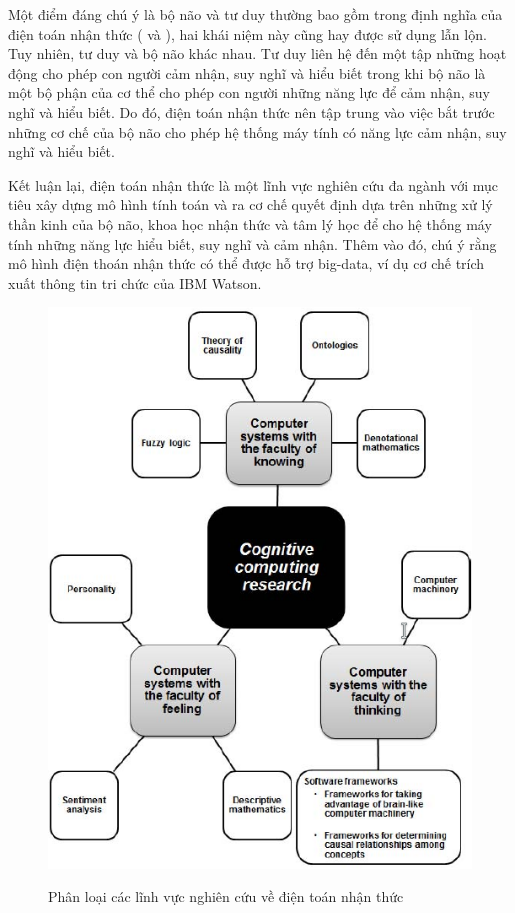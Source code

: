 \documentclass{article}
\begin{document}
Một điểm đáng chú ý là bộ não và tư duy thường bao gồm trong định nghĩa của điện toán nhận thức (\citet{wang2012denotational} và \citet{modha2011cognitive}), hai khái niệm này cũng hay được sử dụng lẫn lộn. Tuy nhiên, tư duy và bộ não khác nhau. Tư duy liên hệ đến một tập những hoạt động cho phép con người cảm nhận, suy nghĩ và hiểu biết trong khi bộ não là một bộ phận của cơ thể cho phép con người những năng lực để cảm nhận, suy nghĩ và hiểu biết. Do đó, điện toán nhận thức nên tập trung vào việc bắt trước những cơ chế của bộ não cho phép hệ thống máy tính có năng lực cảm nhận, suy nghĩ và hiểu biết.

Kết luận lại, điện toán nhận thức là một lĩnh vực nghiên cứu đa ngành với mục tiêu xây dựng mô hình tính toán và ra cơ chế quyết định dựa trên những xử lý thần kinh của bộ não, khoa học nhận thức và tâm lý học để cho hệ thống máy tính những năng lực hiểu biết, suy nghĩ và cảm nhận. Thêm vào đó, chú ý rằng mô hình điện thoán nhận thức có thể được hỗ trợ big-data, ví dụ cơ chế trích xuất thông tin tri chức của IBM Watson.

\begin{figure}[h!]
\caption{Phân loại các lĩnh vực nghiên cứu về điện toán nhận thức}
\includegraphics[width=\columnwidth]{fig-1-taxonamy}
\label{fig:1-taxonamy}
\end{figure}
\end{document}
